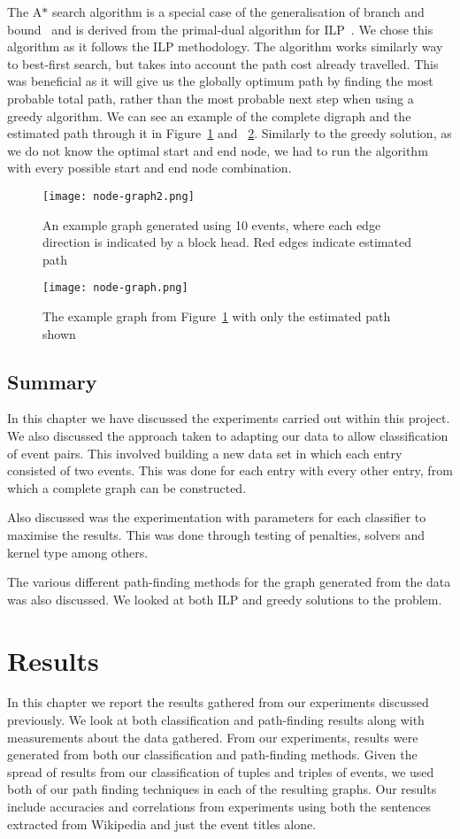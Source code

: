 \documentclass[bsc,frontabs,twoside,singlespacing,parskip,deptreport]{infthesis}     %
\begin{document}
The A$*$ search algorithm is a special case of the generalisation of branch and bound~\cite{balas1983branch} and is derived from the primal-dual algorithm for ILP~\cite{ye2012note}.
We chose this algorithm as it follows the ILP methodology. The algorithm works similarly way to best-first search, but takes into account the path cost already travelled.
This was beneficial as it will give us the globally optimum path by finding the most probable total path, rather than the most probable next step when using a
greedy algorithm. We can see an example of the complete digraph and the estimated path through it in Figure~\ref{fig:minigraph} and ~\ref{fig:minigraph-clean}.
Similarly to the greedy solution, as we do not know the optimal start and end node, we had to run the algorithm with every possible start and end node combination.
\begin{figure}[H]
\centering
  \centering
  \texttt{[image: node-graph2.png]}
  \caption{An example graph generated using 10 events, where each edge direction is indicated by a block head. Red edges indicate estimated path}
  \label{fig:minigraph}
\end{figure}
\begin{figure}[H]
  \centering
  \texttt{[image: node-graph.png]}
\caption{The example graph from Figure~\ref{fig:minigraph} with only the estimated path shown }
\label{fig:minigraph-clean}
\end{figure}

\section{Summary}
In this chapter we have discussed the experiments carried out within this project.
We also discussed the approach taken to adapting our data to allow classification of event pairs. This involved building a new data set
in which each entry consisted of two events. This was done for each entry with every other entry, from which a complete
graph can be constructed.

Also discussed was the experimentation with parameters for each classifier to maximise the results. This was done through
testing of penalties, solvers and kernel type among others.

The various different path-finding methods for the graph generated from the data was also discussed.
We looked at both ILP and greedy solutions to the problem.

\chapter{Results}\label{chapter:results}
In this chapter we report the results gathered from our experiments discussed previously.
We look at both classification and path-finding results along with measurements about the data gathered.
From our experiments, results were generated from both our classification and path-finding methods.
Given the spread of results from our classification of tuples and triples of events, we used both of our path finding
techniques in each of the resulting graphs. Our results include accuracies and correlations from
experiments using both the sentences extracted from Wikipedia and just the event titles alone.   
\end{document}
